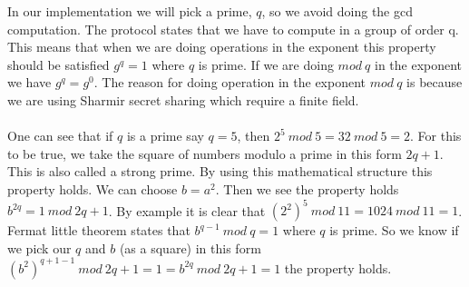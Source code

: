  In our implementation we will pick a prime, \begin{math}q\end{math}, so we avoid doing the gcd computation. The protocol states that we have to compute in a group of order q. This means that when we are doing operations in the exponent this property should be satisfied \begin{math}g^q=1\end{math} where \begin{math}q\end{math} is prime. If we are doing \begin{math}mod \ q \end{math} in the exponent we have \begin{math}g^q=g^0\end{math}. The reason for doing operation in the exponent \begin{math}mod \ q\end{math} is because we are using Sharmir secret sharing which require a finite field.\\\\
One can see that if \begin{math}q\end{math} is a prime say \begin{math}q=5\end{math}, then \begin{math}2^5 \ mod \ 5 = 32 \ mod \ 5 = 2\end{math}. For this to be true, we take the square of numbers modulo a prime in this form \begin{math}2q+1\end{math}. This is also called a strong prime. By using this mathematical structure this property holds. We can choose \begin{math}b=a^2\end{math}. Then we see the property holds \begin{math}b^{2q} = 1 \ mod \ 2q+1\end{math}. By example it is clear that \begin{math}(2^2)^5 \ mod \ 11 = 1024 \ mod \ 11 = 1\end{math}. Fermat little theorem states that \begin{math}b^{q-1} \ mod \ q = 1\end{math} where \begin{math}q\end{math} is prime. So we know if we pick our \begin{math}q\end{math} and \begin{math}b\end{math} (as a square)  in this form \begin{math}(b^{2})^{q+1-1} \ mod \ 2q+1 =1 =  b^{2q} \ mod \ 2q+1 =1\end{math} the property holds.

